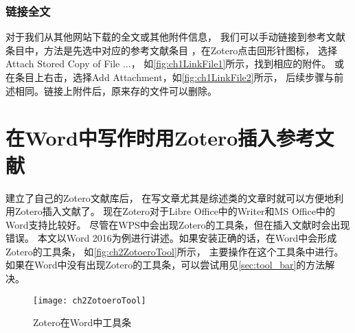 \documentclass[cn,11pt,chinese]{elegantbook}
\begin{document}
		\subsection{链接全文}\label{sec:linkFulltex}
				对于我们从其他网站下载的全文或其他附件信息，
				我们可以手动链接到参考文献条目中，方法是先选中对应的参考文献条目
				，在Zotero点击回形针图标，
				选择Attach Stored Copy of File ...，
				如\autoref{fig:ch1LinkFile1}所示，找到相应的附件。
				或在条目上右击，选择Add Attachment，如\autoref{fig:ch1LinkFile2}所示，
				后续步骤与前述相同。链接上附件后，原来存的文件可以删除。
  \chapter{在Word中写作时用Zotero插入参考文献}\label{ch:insert}
		建立了自己的Zotero文献库后，
		在写文章尤其是综述类的文章时就可以方便地利用Zotero插入文献了。
		现在Zotero对于Libre Office中的Writer和MS Office中的Word支持比较好。
		尽管在WPS中会出现Zotero的工具条，但在插入文献时会出现错误。
		本文以Word 2016为例进行讲述。如果安装正确的话，在Word中会形成Zotero的工具条，
		如\autoref{fig:ch2ZotoeroTool}所示，
		主要操作在这个工具条中进行。
		如果在Word中没有出现Zotero的工具条，可以尝试用见\cref{sec:tool_bar}的方法解决。
			\begin{figure}[htbp]
				\centering
				\texttt{[image: ch2ZotoeroTool]}
				\caption{Zotero在Word中工具条}
				\label{fig:ch2ZotoeroTool}
			\end{figure}
		
\end{document}
